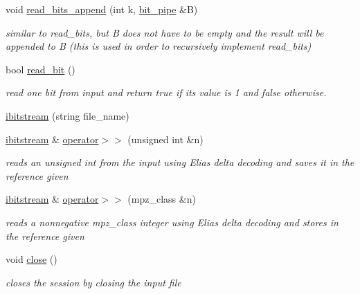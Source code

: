 \begin{DoxyCompactItemize}
void \hyperlink{classibitstream_acec2e9efa21551ce8db784f5b0bbd1b5}{read\+\_\+bits\+\_\+append} (int k, \hyperlink{classbit__pipe}{bit\+\_\+pipe} \&B)
\begin{DoxyCompactList}\small\item\em similar to read\+\_\+bits, but B does not have to be empty and the result will be appended to B (this is used in order to recursively implement read\+\_\+bits) \end{DoxyCompactList}\item 
bool \hyperlink{classibitstream_a895239acf7179f6778388c39c97643e4}{read\+\_\+bit} ()
\begin{DoxyCompactList}\small\item\em read one bit from input and return true if its value is 1 and false otherwise. \end{DoxyCompactList}\item 
\hyperlink{classibitstream_af5f00b64072ed3ffe495b7712a71e3eb}{ibitstream} (string file\+\_\+name)
\item 
\hyperlink{classibitstream}{ibitstream} \& \hyperlink{classibitstream_ae3e91ecc9ff17eef98d72d44aec02eca}{operator$>$$>$} (unsigned int \&n)
\begin{DoxyCompactList}\small\item\em reads an unsigned int from the input using Elias delta decoding and saves it in the reference given \end{DoxyCompactList}\item 
\hyperlink{classibitstream}{ibitstream} \& \hyperlink{classibitstream_a0264d01fa1211c4bb73f5de2bc68adbc}{operator$>$$>$} (mpz\+\_\+class \&n)
\begin{DoxyCompactList}\small\item\em reads a nonnegative mpz\+\_\+class integer using Elias delta decoding and stores in the reference given \end{DoxyCompactList}\item 
void \hyperlink{classibitstream_aa7b59600e58571b802d6d0dadf92d37a}{close} ()
\begin{DoxyCompactList}\small\item\em closes the session by closing the input file \end{DoxyCompactList}\end{DoxyCompactItemize}

